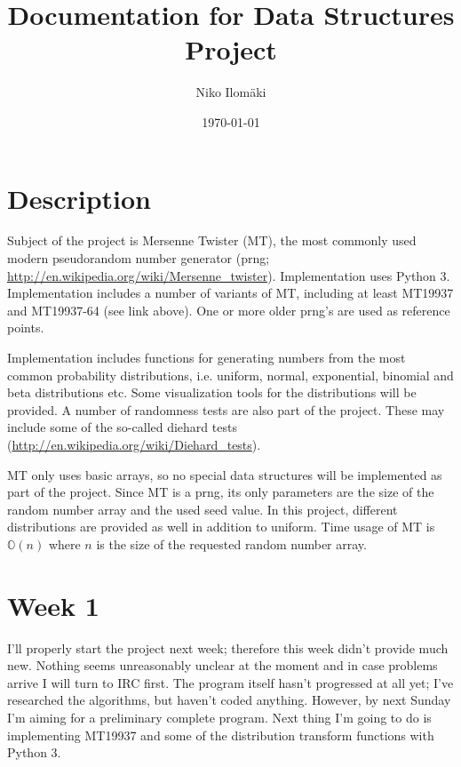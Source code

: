 \documentclass[reprint,aip]{revtex4-1}
\begin{document}
\title{Documentation for Data Structures Project}
\date{\today}
\author{Niko Ilomäki}

\maketitle

\section{Description}

Subject of the project is Mersenne Twister (MT), the most commonly used modern pseudorandom number generator (prng; \url{http://en.wikipedia.org/wiki/Mersenne_twister}). Implementation uses Python 3. Implementation includes a number of variants of MT, including at least MT19937 and MT19937-64 (see link above). One or more older prng's are used as reference points.

Implementation includes functions for generating numbers from the most common probability distributions, i.e. uniform, normal, exponential, binomial and beta distributions etc. Some visualization tools for the distributions will be provided. A number of randomness tests are also part of the project. These may include some of the so-called diehard tests (\url{http://en.wikipedia.org/wiki/Diehard_tests}).

MT only uses basic arrays, so no special data structures will be implemented as part of the project. Since MT is a prng, its only parameters are the size of the random number array and the used seed value. In this project, different distributions are provided as well in addition to uniform. Time usage of MT is $\mathbb{O}(n)$ where $n$ is the size of the requested random number array.

\section{Week 1}

I'll properly start the project next week; therefore this week didn't provide much new. Nothing seems unreasonably unclear at the moment and in case problems arrive I will turn to IRC first. The program itself hasn't progressed at all yet; I've researched the algorithms, but haven't coded anything. However, by next Sunday I'm aiming for a preliminary complete program. Next thing I'm going to do is implementing MT19937 and some of the distribution transform functions with Python 3.
\end{document}

